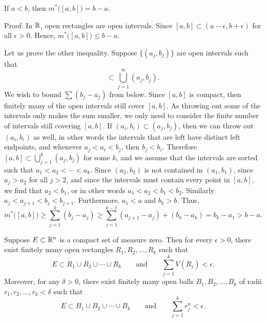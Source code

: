 \begin{example}
If $a < b$, then $m^*\bigl([a,b]\bigr) = b-a$.

Proof:
In ${\mathbb{R}}$, open rectangles are open intervals.
Since $[a,b] \subset (a-\epsilon,b+\epsilon)$ for all $\epsilon > 0$.
Hence, $m^*\bigl([a,b]\bigr) \leq b-a$.

Let us prove the other inequality.
Suppose $\bigl\{ (a_j,b_j) \bigr\}$ are open intervals such that
\begin{equation*}
[a,b] \subset \bigcup_{j=1}^\infty (a_j,b_j) .
\end{equation*}
We wish to bound $\sum (b_j-a_j)$ from below.
Since $[a,b]$ is compact, then finitely many of the open intervals
still cover $[a,b]$.  As throwing out some of the intervals only makes the
sum smaller, we only need to consider the finite number of intervals
still covering $[a,b]$.
If $(a_i,b_i) \subset (a_j,b_j)$, then we can throw out
$(a_i,b_i)$ as well, in other words the intervals that are left
have distinct left endpoints, and whenever
$a_j < a_i < b_j$, then $b_j < b_i$.
Therefore 
$[a,b] \subset \bigcup_{j=1}^k (a_j,b_j)$ for some $k$, and
we assume that the intervals are sorted such that $a_1 < a_2 < \cdots <
a_k$.  Since $(a_2,b_2)$ is not contained in $(a_1,b_1)$,
since $a_j > a_2$ for all $j > 2$, and since the intervals
must contain every point in $[a,b]$, we find that $a_2 < b_1$, or in
other words
$a_1 < a_2 < b_1 < b_2$.  Similarly
$a_j < a_{j+1} < b_j < b_{j+1}$.  Furthermore, $a_1 < a$ and $b_k > b$.
Thus,
\begin{equation*}
m^*\bigl([a,b]\bigr) \geq
\sum_{j=1}^k (b_j-a_j)
\geq
\sum_{j=1}^{k-1} (a_{j+1}-a_j)
+
(b_k-a_k)
=
b_k-a_1 > b-a .
\end{equation*}
\end{example}

\begin{prop} \label{mv:prop:compactnull}
Suppose $E \subset {\mathbb{R}}^n$ is a compact set of measure zero.  Then for
every $\epsilon > 0$, there exist
finitely many open rectangles $R_1,R_2,\ldots,R_k$ such that
\begin{equation*}
E \subset R_1 \cup R_2 \cup \cdots \cup R_k
\qquad \text{and} \qquad
\sum_{j=1}^k V(R_j) < \epsilon.
\end{equation*}
Moreover, for any $\delta > 0$,
there exist finitely many open balls $B_1,B_2,\ldots,B_k$ of radii
$r_1,r_2,\ldots,r_k < \delta$ such that
\begin{equation*}
E \subset B_1 \cup B_2 \cup \cdots \cup B_k
\qquad \text{and} \qquad
\sum_{j=1}^k r_j^n < \epsilon.
\end{equation*}
\end{prop}


